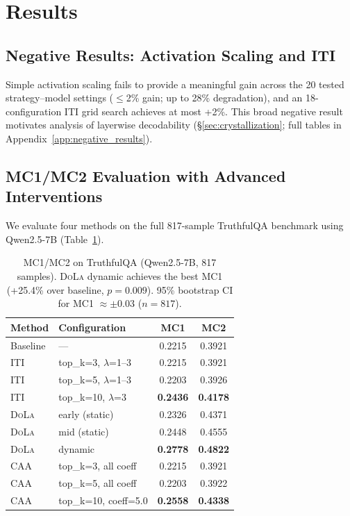 \documentclass[11pt]{article}
\newcommand{\iti}{\textsc{ITI}}
\newcommand{\dola}{\textsc{DoLa}}
\newcommand{\caa}{\textsc{CAA}}
\begin{document}
\section{Results}
\label{sec:results}

\subsection{Negative Results: Activation Scaling and ITI}
\label{sec:negative_results}

Simple activation scaling fails to provide a meaningful gain across the 20 tested strategy--model settings ($\leq$2\% gain; up to 28\% degradation), and an 18-configuration ITI grid search achieves at most +2\%. This broad negative result motivates analysis of layerwise decodability (\S\ref{sec:crystallization}; full tables in Appendix~\ref{app:negative_results}).

\subsection{MC1/MC2 Evaluation with Advanced Interventions}
\label{sec:mc_results}

We evaluate four methods on the full 817-sample TruthfulQA benchmark using Qwen2.5-7B (Table~\ref{tab:mc_results}).

\begin{table}[t]
\centering
\small
\begin{tabular}{llcc}
\toprule
\textbf{Method} & \textbf{Configuration} & \textbf{MC1} & \textbf{MC2} \\
\midrule
Baseline & --- & 0.2215 & 0.3921 \\
\midrule
\iti{} & top\_k=3, $\lambda$=1--3 & 0.2215 & 0.3921 \\
\iti{} & top\_k=5, $\lambda$=1--3 & 0.2203 & 0.3926 \\
\iti{} & top\_k=10, $\lambda$=3 & \textbf{0.2436} & \textbf{0.4178} \\
\midrule
\dola{} & early (static) & 0.2326 & 0.4371 \\
\dola{} & mid (static) & 0.2448 & 0.4555 \\
\dola{} & dynamic & \textbf{0.2778} & \textbf{0.4822} \\
\midrule
\caa{} & top\_k=3, all coeff & 0.2215 & 0.3921 \\
\caa{} & top\_k=5, all coeff & 0.2203 & 0.3922 \\
\caa{} & top\_k=10, coeff=5.0 & \textbf{0.2558} & \textbf{0.4338} \\
\bottomrule
\end{tabular}
\caption{MC1/MC2 on TruthfulQA (Qwen2.5-7B, 817 samples). \dola{} dynamic achieves the best MC1 (+25.4\% over baseline, $p{=}0.009$). 95\% bootstrap CI for MC1 $\approx \pm 0.03$ ($n{=}817$).}
\label{tab:mc_results}
\end{table}
\end{document}
